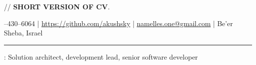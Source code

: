 \documentclass[11pt]{article}
\newif\ifdetailed
\begin{document}
%
\ifdetailed
{\small{// {\textbf{DETAILED VERSION OF CV}}. }}
\else
{\small{// {\textbf{SHORT VERSION OF CV}}. }}
\fi

\vspace{0.5em}

--430--6064    |    \url{https://github.com/akushsky}   |   \href{mailto:namelles.one@gmail.com}{namelles.one@gmail.com}  |  Be’er Sheba, Israel  \ifdetailed | Sivan 11, 5748 \fi

\vspace{0.5em}

\hrule

\vspace{1.5em}

\ifdetailed
\noindent {\textbf{CAREER OBJECTIVE}}: To gain an \textbf{international experience} in IT related role (solution architect, development lead, senior software developer). Preferably working with highload systems, big data and distributed software.
\else
{}: Solution architect, development lead, senior software developer
\fi

\vspace{1em}
\end{document}
